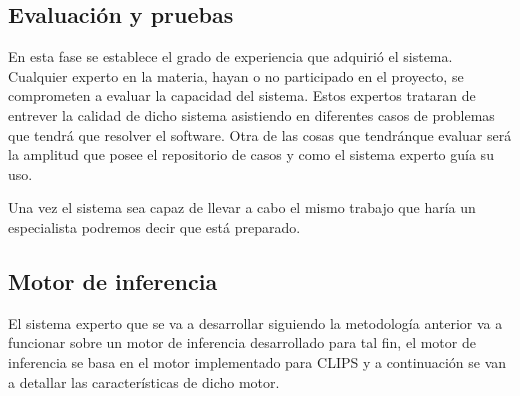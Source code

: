


\subsection{Evaluación y pruebas}

En esta fase se establece el grado de experiencia que adquirió el sistema. Cualquier
 experto en la materia, hayan o no participado en el proyecto, se comprometen a evaluar
 la capacidad del sistema. Estos expertos trataran de entrever la calidad de dicho sistema
 asistiendo en diferentes casos de problemas que tendrá que resolver el software. Otra de
 las cosas que tendránque evaluar será la amplitud que posee el repositorio de casos y como
 el sistema experto guía su uso.


Una vez el sistema sea capaz de llevar a cabo el mismo trabajo que haría un especialista
 podremos decir que está preparado.



\subsection{Motor de inferencia}
El sistema experto que se va a desarrollar siguiendo la metodología anterior va
 a funcionar sobre un motor de inferencia desarrollado para tal fin, el motor
 de inferencia se basa en el motor implementado para CLIPS y a continuación se van
 a detallar las características de dicho motor.


